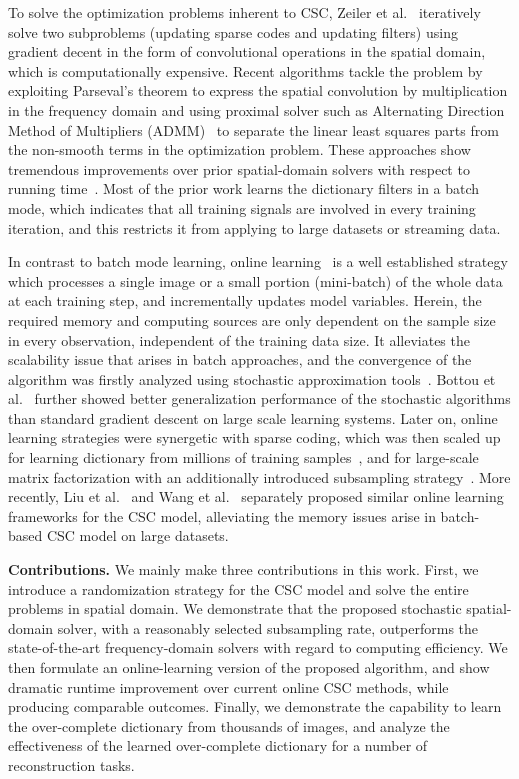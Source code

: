 To solve the optimization problems inherent to CSC, Zeiler et
al.~\cite{zeiler2010deconvolutional} iteratively solve two subproblems
(updating sparse codes and updating filters) using gradient decent in
the form of convolutional operations in the spatial domain, which is
computationally expensive. Recent algorithms tackle the problem by
exploiting Parseval's theorem to express the spatial convolution by
multiplication in the frequency domain and using proximal solver such
as Alternating Direction Method of Multipliers
(ADMM)~\cite{boyd2011distributed} to separate the linear least squares
parts from the non-smooth terms in the optimization
problem. These approaches show tremendous improvements over prior
spatial-domain solvers with respect to running
time~\cite{bristow2013fast,heide2015fast,wohlberg2016efficient,choudhury2017consensus}. Most
of the prior work learns the dictionary filters in a batch mode, which
indicates that all training signals are involved in every training
iteration, and this restricts it from applying to large datasets or
streaming data.

In contrast to batch mode learning, online
learning~\cite{shalev2012online} is a well established strategy which
processes a single image or a small portion (mini-batch) of the whole
data at each training step, and incrementally updates model
variables. Herein, the required memory and computing sources are only
dependent on the sample size in every observation, independent of the
training data size. It alleviates the scalability issue that arises in
batch approaches, and the convergence of the algorithm was firstly
analyzed using stochastic approximation
tools~\cite{bottou1998online}. Bottou et
al.~\cite{bousquet2008tradeoffs} further showed better generalization
performance of the stochastic algorithms than standard gradient
descent on large scale learning systems. Later on, online learning
strategies were synergetic with sparse coding, which was then scaled
up for learning dictionary from millions of training
samples~\cite{mairal2009online,mairal2010online}, and for large-scale
matrix factorization with an additionally introduced subsampling
strategy~\cite{mensch2016dictionary}. More recently, Liu et
al.~\cite{liu-2018-first} and Wang et al.~\cite{wang2018scalable}
separately proposed similar online learning frameworks for the CSC
model, alleviating the memory issues arise in batch-based CSC model on
large datasets.

{\bfseries Contributions.} We mainly make three contributions in this
work. First, we introduce a randomization strategy for the CSC
model and solve the entire problems in spatial domain. We demonstrate
that the proposed stochastic spatial-domain solver, with a reasonably
selected subsampling rate, outperforms the state-of-the-art
frequency-domain solvers with regard to computing efficiency. We then
formulate an online-learning version of the proposed algorithm, and
show dramatic runtime improvement over current online CSC methods,
while producing comparable outcomes. Finally, we demonstrate the
capability to learn the over-complete dictionary from thousands of
images, and analyze the effectiveness of the learned over-complete
dictionary for a number of reconstruction tasks.



